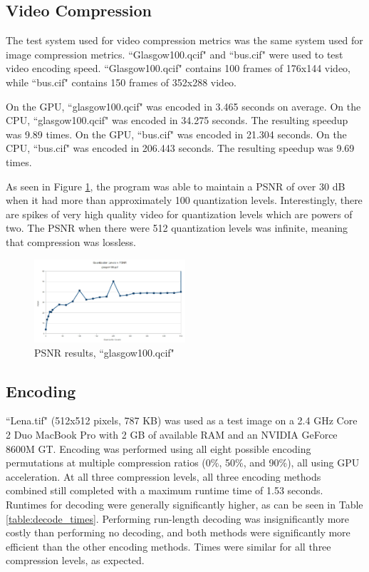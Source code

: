 \documentclass[10pt,twocolumn,twoside]{IEEEtran}
\begin{document}
\subsection{Video Compression}
The test system used for video compression metrics was the same system used for image compression metrics. ``Glasgow100.qcif" and ``bus.cif" were used to test video encoding speed. ``Glasgow100.qcif" contains 100 frames of 176x144 video, while ``bus.cif" contains 150 frames of 352x288 video.

On the GPU, ``glasgow100.qcif" was encoded in 3.465 seconds on average. On the CPU, ``glasgow100.qcif" was encoded in 34.275 seconds. The resulting speedup was 9.89 times. On the GPU, ``bus.cif" was encoded in 21.304 seconds. On the CPU, ``bus.cif" was encoded in 206.443 seconds. The resulting speedup was 9.69 times.

As seen in Figure \ref{fig:glasgow_psnr}, the program was able to maintain a PSNR of over 30 dB when it had more than approximately 100 quantization levels. Interestingly, there are spikes of very high quality video for quantization levels which are powers of two. The PSNR when there were 512 quantization levels was infinite, meaning that compression was lossless.

\begin{figure}[htbp]
\begin{center}
\includegraphics[width=0.5\textwidth]{Images/glasgow100_psnr.jpg}
\caption{PSNR results, ``glasgow100.qcif"}
\label{fig:glasgow_psnr}
\end{center}
\end{figure}

\subsection{Encoding}
``Lena.tif" (512x512 pixels, 787 KB) was used as a test image on a 2.4 GHz Core 2 Duo MacBook Pro with 2 GB of available RAM and an NVIDIA GeForce 8600M GT. Encoding was performed using all eight possible encoding permutations at multiple compression ratios (0\%, 50\%, and 90\%), all using GPU acceleration. At all three compression levels, all three encoding methods combined still completed with a maximum runtime time of 1.53 seconds. Runtimes for decoding were generally significantly higher, as can be seen in Table \ref{table:decode_times}. Performing run-length decoding was insignificantly more costly than performing no decoding, and both methods were significantly more efficient than the other encoding methods. Times were similar for all three compression levels, as expected.
\end{document}
